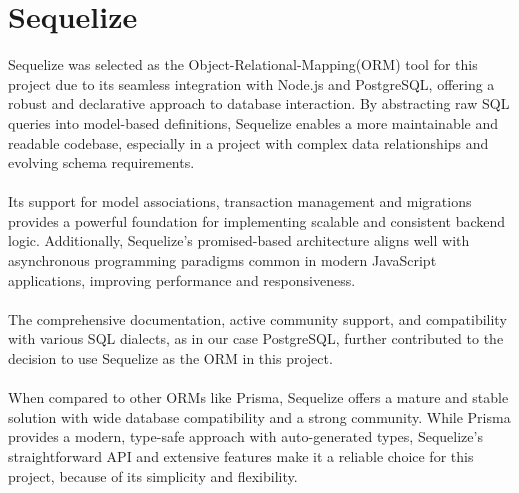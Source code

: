 \documentclass[a4paper,12pt]{report}
\begin{document}
\section{Sequelize}
Sequelize was selected as the Object-Relational-Mapping(ORM) tool for this project due to its seamless integration with Node.js and PostgreSQL, offering a robust and declarative approach to database interaction. By abstracting raw SQL queries into model-based definitions, Sequelize enables a more maintainable and readable codebase, especially in a project with complex data relationships and evolving schema requirements.\\\\
Its support for model associations, transaction management and migrations provides a powerful foundation for implementing scalable and consistent backend logic. Additionally, Sequelize's promised-based architecture aligns well with asynchronous programming paradigms common in modern JavaScript applications, improving performance and responsiveness.\parencite{sequelizegit}\\\\
The comprehensive documentation, active community support, and compatibility with various SQL dialects, as in our case PostgreSQL, further contributed to the decision to use Sequelize as the ORM in this project.\\\\
When compared to other ORMs like Prisma, Sequelize offers a mature and stable solution with wide database compatibility and a strong community. While Prisma provides a modern, type-safe approach with auto-generated types, Sequelize's straightforward API and extensive features make it a reliable choice for this project, because of its simplicity and flexibility.\parencite{Ormcomparemedium}\parencite{Ormcomparedhiwise}
\end{document}
